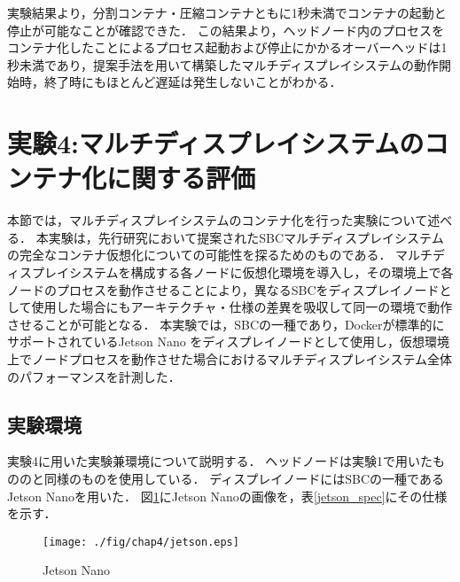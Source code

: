 \begin{table}[H]
    \centering
    \caption{コンテナの起動と停止に要する時間}\label{tab1}
\end{table}

実験結果より，分割コンテナ・圧縮コンテナともに1秒未満でコンテナの起動と停止が可能なことが確認できた．
この結果より，ヘッドノード内のプロセスをコンテナ化したことによるプロセス起動および停止にかかるオーバーヘッドは1秒未満であり，提案手法を用いて構築したマルチディスプレイシステムの動作開始時，終了時にもほとんど遅延は発生しないことがわかる．

\section{実験4:マルチディスプレイシステムのコンテナ化に関する評価}
本節では，マルチディスプレイシステムのコンテナ化を行った実験について述べる．
本実験は，先行研究において提案されたSBCマルチディスプレイシステムの完全なコンテナ仮想化についての可能性を探るためのものである．
マルチディスプレイシステムを構成する各ノードに仮想化環境を導入し，その環境上で各ノードのプロセスを動作させることにより，異なるSBCをディスプレイノードとして使用した場合にもアーキテクチャ・仕様の差異を吸収して同一の環境で動作させることが可能となる．
本実験では，SBCの一種であり，Dockerが標準的にサポートされているJetson Nano \cite{jetson}をディスプレイノードとして使用し，仮想環境上でノードプロセスを動作させた場合におけるマルチディスプレイシステム全体のパフォーマンスを計測した．

\subsection*{実験環境}
実験4に用いた実験兼環境について説明する．
ヘッドノードは実験1で用いたもののと同様のものを使用している．
ディスプレイノードにはSBCの一種であるJetson Nanoを用いた．
図\ref{jetson}にJetson Nanoの画像を，表\ref{jetson_spec}にその仕様を示す．

\begin{figure}[H]
    \hspace*{\fill}
    \texttt{[image: ./fig/chap4/jetson.eps]}
    \hspace*{\fill}
    \caption{Jetson Nano}
    \label{jetson}
\end{figure}

